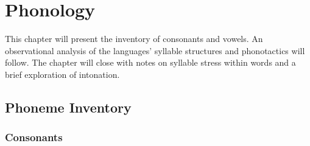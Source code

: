 \chapter{Phonology}
\label{cha:tvk-phonology}

This chapter will present the inventory of consonants and vowels. An observational analysis of the \langtvk{} languages' syllable structures and phonotactics will follow. The chapter will close with notes on syllable stress within words and a brief exploration of intonation.

\section{Phoneme Inventory}
\label{sec:tvk-phone-inventory}

\subsection{Consonants}
\label{subsec:tvk-consonants}

